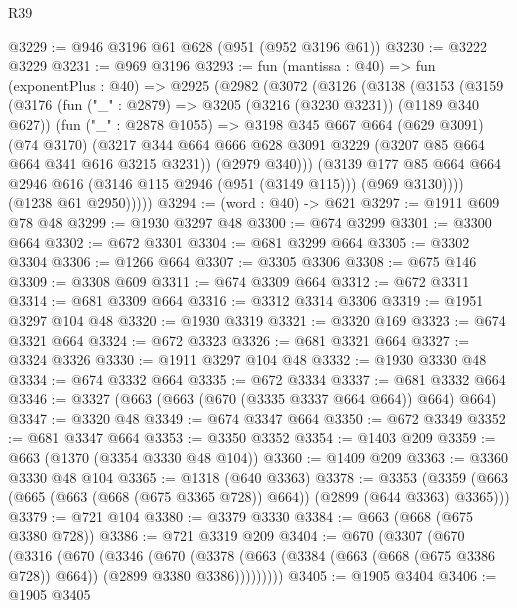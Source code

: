 \begin{lexlean}{R39}
\begin{coremodule}
@3229 := @946 @3196 @61 @628 (@951 (@952 @3196 @61))
@3230 := @3222 @3229
@3231 := @969 @3196
@3293 := fun (mantissa : @40) =>
  fun (exponentPlus : @40) =>
  @2925
    (@2982
      (@3072
        (@3126
          (@3138
            (@3153
              (@3159
                (@3176
                  (fun ("_" : @2879) => @3205 (@3216 (@3230 @3231)) (@1189 @340 @627))
                  (fun ("_" : @2878 @1055) =>
                  @3198
                    @345
                    @667
                    @664
                    (@629 @3091)
                    (@74 @3170)
                    (@3217
                      @344
                      @664
                      @666
                      @628
                      @3091
                      @3229
                      (@3207 @85 @664 @664 @341 @616 @3215 @3231))
                    (@2979 @340)))
                (@3139
                  @177
                  @85
                  @664
                  @664
                  @2946
                  @616
                  (@3146 @115 @2946 (@951 (@3149 @115)))
                  (@969 @3130))))
            (@1238 @61 @2950)))))
@3294 := (word : @40) -> @621
@3297 := @1911 @609 @78 @48
@3299 := @1930 @3297 @48
@3300 := @674 @3299
@3301 := @3300 @664
@3302 := @672 @3301
@3304 := @681 @3299 @664
@3305 := @3302 @3304
@3306 := @1266 @664
@3307 := @3305 @3306
@3308 := @675 @146
@3309 := @3308 @609
@3311 := @674 @3309 @664
@3312 := @672 @3311
@3314 := @681 @3309 @664
@3316 := @3312 @3314 @3306
@3319 := @1951 @3297 @104 @48
@3320 := @1930 @3319
@3321 := @3320 @169
@3323 := @674 @3321 @664
@3324 := @672 @3323
@3326 := @681 @3321 @664
@3327 := @3324 @3326
@3330 := @1911 @3297 @104 @48
@3332 := @1930 @3330 @48
@3334 := @674 @3332 @664
@3335 := @672 @3334
@3337 := @681 @3332 @664
@3346 := @3327 (@663 (@663 (@670 (@3335 @3337 @664 @664)) @664) @664)
@3347 := @3320 @48
@3349 := @674 @3347 @664
@3350 := @672 @3349
@3352 := @681 @3347 @664
@3353 := @3350 @3352
@3354 := @1403 @209
@3359 := @663 (@1370 (@3354 @3330 @48 @104))
@3360 := @1409 @209
@3363 := @3360 @3330 @48 @104
@3365 := @1318 (@640 @3363)
@3378 := @3353 (@3359 (@663 (@665 (@663 (@668 (@675 @3365 @728)) @664)) (@2899 (@644 @3363) @3365)))
@3379 := @721 @104
@3380 := @3379 @3330
@3384 := @663 (@668 (@675 @3380 @728))
@3386 := @721 @3319 @209
@3404 := @670
    (@3307
      (@670
        (@3316
          (@670
            (@3346
              (@670
                (@3378
                  (@663 (@3384 (@663 (@668 (@675 @3386 @728)) @664)) (@2899 @3380 @3386)))))))))
@3405 := @1905 @3404
@3406 := @1905 @3405

\end{coremodule}
\end{lexlean}
